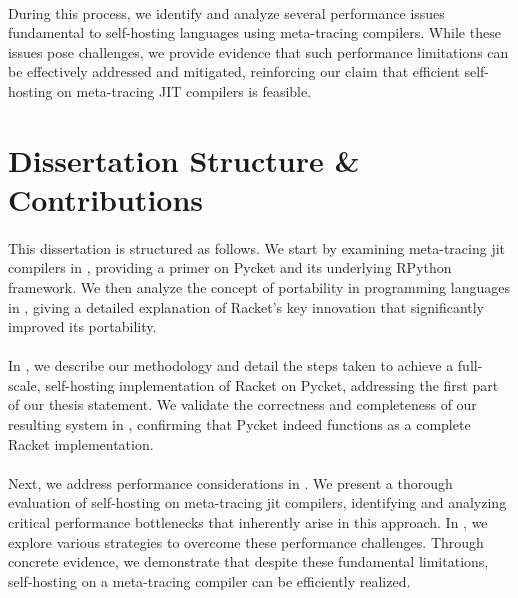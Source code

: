         \paragraph{}%
            During this process, we identify and analyze several performance issues fundamental to self-hosting languages using meta-tracing compilers. While these issues pose challenges, we provide evidence that such performance limitations can be effectively addressed and mitigated, reinforcing our claim that efficient self-hosting on meta-tracing JIT compilers is feasible.

    \section[\texorpdfstring{Dissertation Structure \& Contributions}{Structure \& Contributions}]{Dissertation Structure \& Contributions}

        \paragraph{}%
            This dissertation is structured as follows. We start by examining meta-tracing \gls{jit} compilers in , providing a primer on Pycket and its underlying RPython framework. We then analyze the concept of portability in programming languages in , giving a detailed explanation of Racket's key innovation that significantly improved its portability.

        \paragraph{}%
            In , we describe our methodology and detail the steps taken to achieve a full-scale, self-hosting implementation of Racket on Pycket, addressing the first part of our thesis statement. We validate the correctness and completeness of our resulting system in , confirming that Pycket indeed functions as a complete Racket implementation.

        \paragraph{}%
            Next, we address performance considerations in . We present a thorough evaluation of self-hosting on meta-tracing \gls{jit} compilers, identifying and analyzing critical performance bottlenecks that inherently arise in this approach. In , we explore various strategies to overcome these performance challenges. Through concrete evidence, we demonstrate that despite these fundamental limitations, self-hosting on a meta-tracing compiler can be efficiently realized.

